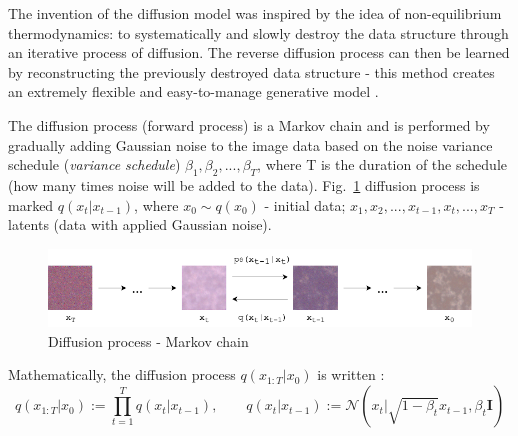 \documentclass[runningheads]{llncs}
\begin{document}
The invention of the diffusion model was inspired by the idea of non-equilibrium thermodynamics: to systematically and slowly destroy the data structure through an iterative process of diffusion. The reverse diffusion process can then be learned by reconstructing the previously destroyed data structure - this method creates an extremely flexible and easy-to-manage generative model \cite{Diffusion}.
\par
The diffusion process (forward process) is a Markov chain \cite{MarkovChains} and is performed by gradually adding Gaussian noise to the image data based on the noise variance schedule (\textit{variance schedule}) $\beta_1 , \beta_2, ..., \beta_T$, where T is the duration of the schedule (how many times noise will be added to the data). Fig.~\ref{img:diffusion_process} diffusion process is marked $q(x_t|x_{t-1})$, where $x_0 \sim q(x_0)$ - initial data; $x_1, x_2, ..., x_{t-1}, x_t, ..., x_T$ - latents (data with applied Gaussian noise). \\
\begin{figure}[H]
    \centering
    \includegraphics[scale=0.45]{img/Markov_Chain.png}
    \caption{Diffusion process - Markov chain}
    \label{img:diffusion_process}
\end{figure}
Mathematically, the diffusion process $q(x_{1:T}|x_0)$ is written \cite{Diffusion_Ho}:
\begin{equation}
q(x_{1:T}|x_0) := \prod_{t=1}^{T}q(x_t|x_{t-1}), \quad\quad q(x_t|x_{t-1}) := \mathcal{N}(x_t| \sqrt{1 - \beta_t}x_{t-1}, \beta_t\textbf{I}) \label{eq:diffusion_process}
\end{equation}
\end{document}

